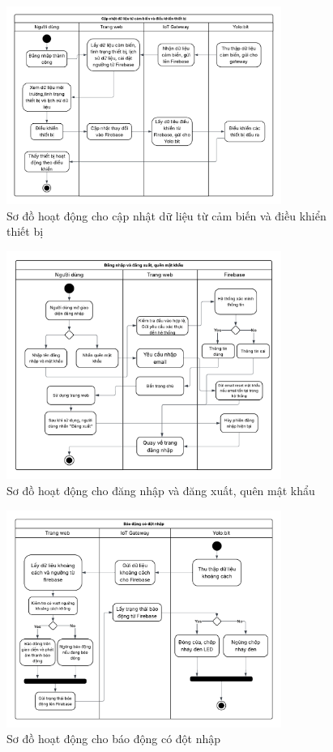 \begin{figure}[H]
    \centering
    \includegraphics[width=0.8\textwidth]{figures/activity_1.png}
    \caption{Sơ đồ hoạt động cho cập nhật dữ liệu từ cảm biến và điều khiển thiết bị}
    \label{fig:activity_1}
\end{figure}

\begin{figure}[H]
    \centering
    \includegraphics[width=0.8\textwidth]{figures/activity_2.png}
    \caption{Sơ đồ hoạt động cho đăng nhập và đăng xuất, quên mật khẩu}
    \label{fig:activity_2}
\end{figure}

\begin{figure}[H]
    \centering
    \includegraphics[width=0.8\textwidth]{figures/activity_3.png}
    \caption{Sơ đồ hoạt động cho báo động có đột nhập}
    \label{fig:activity_3}
\end{figure}

